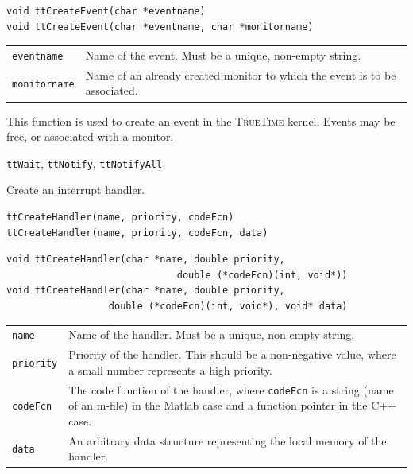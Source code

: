 \documentclass[final,twoside]{rapport}
\begin{document}
\Csyntax
\begin{verbatim}
void ttCreateEvent(char *eventname) 
void ttCreateEvent(char *eventname, char *monitorname) 
\end{verbatim}

\args
\begin{tabularx}{\hsize}{l>{\raggedright\arraybackslash}X}
  {\tt eventname} & Name of the event. Must be a unique, non-empty string. \\
  {\tt monitorname} & Name of an already created monitor to which the
  event is to be associated.
\end{tabularx}

\descr This function is used to create an event in the
\textsc{TrueTime} kernel. Events may be free, or
associated with a monitor.

\seealso 
{\tt ttWait}, {\tt ttNotify}, {\tt ttNotifyAll}



\purpose
Create an interrupt handler.

\Msyntax
\begin{verbatim}
ttCreateHandler(name, priority, codeFcn)
ttCreateHandler(name, priority, codeFcn, data)
\end{verbatim}

\Csyntax
\begin{verbatim}
void ttCreateHandler(char *name, double priority, 
                              double (*codeFcn)(int, void*))
void ttCreateHandler(char *name, double priority, 
                  double (*codeFcn)(int, void*), void* data)
\end{verbatim}

\args
\begin{tabularx}{\hsize}{l>{\raggedright\arraybackslash}X}
  {\tt name} & Name of the handler. Must be a unique, non-empty string. \\
  {\tt priority} & Priority of the handler. This should be a non-negative
  value, where a small number represents a high priority.\\
  {\tt codeFcn} & The code function of the handler, where
  \texttt{codeFcn} is a string (name of an m-file) in the
  Matlab case and a function pointer in the C++ case. \\
  {\tt data} & An arbitrary data structure representing the local
  memory of the handler.
\end{tabularx}
\end{document}
